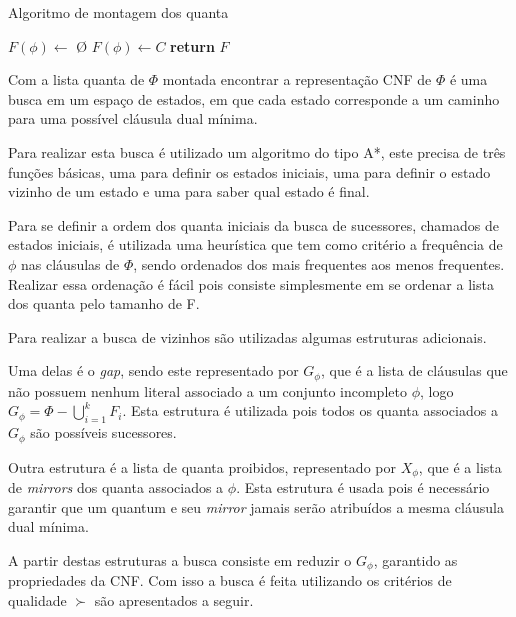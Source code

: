 \documentclass{ufsc-thesis}
\begin{document}
\begin{algorithm}[H]
\caption{Algoritmo de montagem dos quanta} \label{alg:mquanta}
\begin{algorithmic}[1]
	\State$F(\phi) \gets$ \O {}
\EndFor
{}
        \State $F(\phi) \gets C$
    \EndFor
\EndFor
\State \textbf{return} $F$
\EndProcedure
\end{algorithmic}
\end{algorithm}

Com a lista quanta de $\Phi$ montada encontrar a representação CNF de 
$\Phi$ é uma busca em um espaço de estados, em que cada estado 
corresponde a um caminho para uma possível cláusula dual mínima.

Para realizar esta busca é utilizado um algoritmo do tipo A*\cite{Russell2003}, este 
precisa de três funções básicas, uma para definir os estados iniciais, 
uma para definir o estado vizinho de um estado e uma para saber qual estado 
é final.

Para se definir a ordem dos quanta iniciais da busca de sucessores, 
chamados de estados iniciais, é utilizada uma heurística que tem  como 
critério a frequência de $\phi$ nas cláusulas de $\Phi$, sendo ordenados 
dos mais frequentes aos menos frequentes. Realizar essa ordenação é fácil 
pois consiste simplesmente em se ordenar a lista dos quanta pelo tamanho 
de F.

Para realizar a busca de vizinhos são utilizadas algumas estruturas 
adicionais.

Uma delas é o \textit{gap}, sendo este representado por $G_\phi$, que 
é a lista de cláusulas que não possuem nenhum literal associado a um 
conjunto incompleto $\phi$, logo $G_\phi = \Phi - \bigcup_{i=1}^{k}F_i$.
Esta estrutura é utilizada pois todos os quanta associados a $G_\phi$ são 
possíveis sucessores.

Outra estrutura é a lista de quanta proibidos, representado por $X_\phi$, 
que é a lista de \textit{mirrors} dos quanta associados a $\phi$. Esta 
estrutura é usada pois é necessário garantir que um quantum e seu \textit{mirror} 
jamais serão atribuídos a mesma cláusula dual mínima.

A partir destas estruturas a busca consiste em reduzir o $G_\phi$, garantido 
as propriedades da CNF. Com isso a busca é feita utilizando os critérios 
de qualidade $\succ$ são apresentados a seguir.
\end{document}

